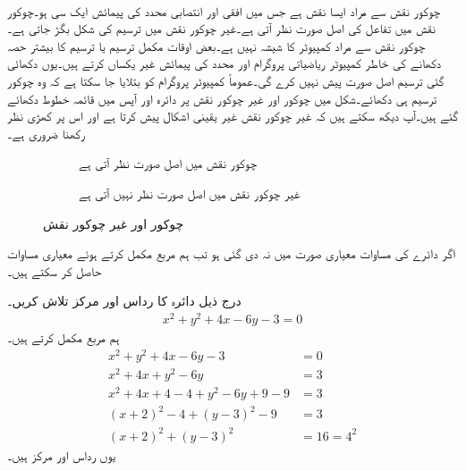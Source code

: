  \quad {}\\
چوکور نقش سے مراد ایسا نقش ہے جس میں افقی اور انتصابی محدد کی پیمائش ایک  سی  ہو۔چوکور نقش میں تفاعل کی اصل صورت نظر آتی ہے۔غیر چوکور نقش میں ترسیم کی شکل بگڑ جاتی ہے۔چوکور نقش سے مراد کمپیوٹر کا شیشہ نہیں ہے۔بعض اوقات مکمل ترسیم یا ترسیم کا بیشتر حصہ دکھانے کی خاطر کمپیوٹر ریاضیاتی پروگرام  اور  محدد کی پیمائش غیر یکساں کرتے ہیں۔یوں دکھائی گئی ترسیم اصل صورت پیش نہیں کرے گی۔عموماً کمپیوٹر پروگرام کو بتلایا جا سکتا ہے کہ وہ چوکور ترسیم ہی دکھائے۔شکل  میں چوکور اور غیر چوکور نقش پر دائرہ اور آپس میں قائمہ خطوط  دکھائے گئے ہیں۔آپ دیکھ سکتے ہیں کہ غیر چوکور نقش غیر یقینی اشکال پیش کرتا ہے اور اس پر کھڑی نظر رکھنا ضروری ہے۔
\begin{figure}
\centering
\begin{subfigure}{0.5\textwidth}
\centering
{}
\caption{چوکور نقش میں اصل صورت نظر آتی ہے}
\end{subfigure}%
\begin{subfigure}{0.5\textwidth}
\centering
{}
\caption{غیر چوکور نقش میں اصل صورت نظر نہیں آتی ہے}
\end{subfigure}%
\caption{چوکور اور غیر چوکور نقش}
\label{شکل_ابتدا_چوکور_غیر_چکر_نقش}
\end{figure}

اگر دائرے کی مساوات معیاری صورت میں نہ دی گئی ہو تب ہم مربع مکمل کرتے ہوئے معیاری مساوات حاصل کر سکتے ہیں۔

درج ذیل دائرہ کا رداس اور مرکز تلاش کریں۔
\begin{align*}
x^2+y^2+4x-6y-3=0
\end{align*}
ہم مربع مکمل کرتے ہیں۔
\begin{align*}
x^2+y^2+4x-6y-3&=0\\
x^2+4x+y^2-6y&=3\\
x^2+4x+4-4+y^2-6y+9-9&=3\\
(x+2)^2-4+(y-3)^2-9&=3\\
(x+2)^2+(y-3)^2&=16=4^2
\end{align*}
یوں رداس  اور مرکز  ہیں۔

